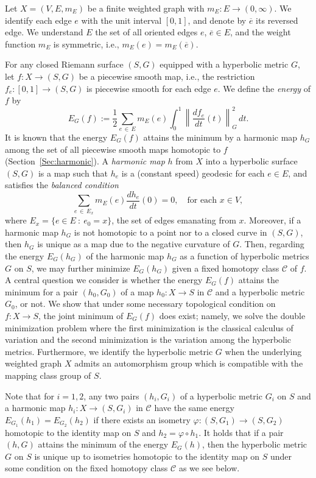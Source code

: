 \documentclass[11pt]{article}
\theoremstyle{definition}
\numberwithin{equation}{section}
\newcommand{\f}{\varphi}
\newcommand{\Cc}{\mathcal{C}}
\newcommand*\wbar{\overline}
\begin{document}
Let $X=(V, E, m_E)$ be a finite weighted graph with $m_E: E \to (0, \infty)$. We identify each edge $e$ with the unit interval $[0, 1]$, and denote by $\wbar e$ its reversed edge. We understand $E$ the set of all oriented edges $e$, $\wbar e \in E$, and the weight function $m_E$ is symmetric, i.e., $m_E(e)=m_E(\wbar e)$.


For any closed Riemann surface $(S, G)$ equipped with a hyperbolic metric $G$, let $f:X \to (S, G)$ be a piecewise smooth map, i.e., the restriction $f_e:[0, 1] \to (S, G)$ is piecewise smooth for each edge $e$. We define the \emph{energy} of $f$ by
\begin{equation}\label{Eq:Dirichlet}
E_G(f):=\frac{1}{2}\sum_{e\,\in\,E}m_E(e)\int_0^1\left\|\frac{d f_e}{dt}(t)\right\|_G^2\,dt.
\end{equation}
It is known that the energy $E_G(f)$ attains the minimum by a harmonic map $h_G$ among the set of all piecewise smooth maps homotopic to $f$ (Section~\ref{Sec:harmonic}). A \emph{harmonic map} $h$ from $X$ into a hyperbolic surface $(S, G)$ is a map such that $h_e$ is a (constant speed) geodesic for each $e \in E$, and satisfies the \emph{balanced condition}
\[
\sum_{e\,\in\,E_x}m_E(e)\frac{d h_e}{dt}(0)=0, \quad \text{for each }x \in V,
\]
where $E_x=\{e \in E \ : \ e_0=x\}$, the set of edges emanating from $x$. Moreover, if a harmonic map $h_G$ is not homotopic to a point nor to a closed curve in $(S, G)$, then $h_G$ is unique as a map due to the negative curvature of $G$. Then, regarding the energy $E_G(h_G)$ of the harmonic map $h_G$ as a function of hyperbolic metrics $G$ on $S$, we may further minimize $E_G(h_G)$ given a fixed homotopy class $\Cc$ of $f$. A central question we consider is whether the energy $E_G(f)$ attains the minimum for a pair $(h_0, G_0)$ of a map $h_0: X \to S$ in $\Cc$ and a hyperbolic metric $G_0$, or not. We show that under some necessary topological condition on $f:X \to S$, the joint minimum of $E_G(f)$ does exist; namely, we solve the double minimization problem where the first minimization is the classical calculus of variation and the second minimization is the variation among the hyperbolic metrics. Furthermore, we identify the hyperbolic metric $G$ when the underlying weighted graph $X$ admits an automorphism group which is compatible with the mapping class group of $S$.

Note that for $i=1, 2$, any two pairs $(h_i, G_i)$ of a hyperbolic metric $G_i$ on $S$ and a harmonic map $h_i:X \to (S, G_i)$ in $\Cc$ have the same energy $E_{G_1}(h_{1})=E_{G_2}(h_{2})$ if there exists an isometry $\f: (S, G_1) \to (S, G_2)$ homotopic to the identity map on $S$ and $h_2=\f \circ h_1$. It holds that if a pair $(h, G)$ attains the minimum of the energy $E_G(h)$, then the hyperbolic metric $G$ on $S$ is unique up to isometries homotopic to the identity map on $S$ under some condition on the fixed homotopy class $\Cc$ as we see below.
\end{document}

